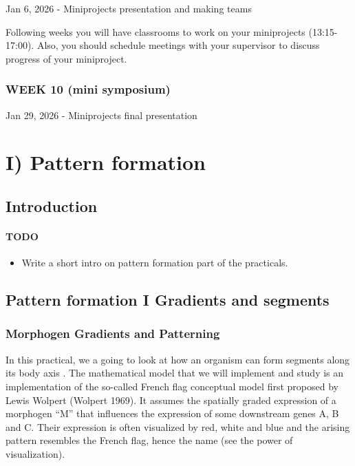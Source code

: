 \documentclass[
  letterpaper,
  DIV=11,
  numbers=noendperiod]{scrreprt}
\providecommand{\tightlist}{%
  \setlength{\itemsep}{0pt}\setlength{\parskip}{0pt}}\usepackage{longtable,booktabs,array}
\theoremstyle{definition}
\theoremstyle{remark}
\begin{document}
Jan 6, 2026 - Miniprojects presentation and making teams

Following weeks you will have classrooms to work on your miniprojects
(13:15-17:00). Also, you should schedule meetings with your supervisor
to discuss progress of your miniproject.

\section*{WEEK 10 (mini symposium)}\label{week-10-mini-symposium}


Jan 29, 2026 - Miniprojects final presentation

\part{I) Pattern formation}

\chapter{Introduction}\label{introduction}

\subsection{TODO}\label{todo}

\begin{itemize}
\tightlist
\item
  Write a short intro on pattern formation part of the practicals.
\end{itemize}

\chapter{\texorpdfstring{Pattern formation I Gradients and
segments}{Pattern formation I   Gradients and segments}}\label{pattern-formation-i-gradients-and-segments}

\section{Morphogen Gradients and
Patterning}\label{morphogen-gradients-and-patterning}

In this practical, we a going to look at how an organism can form
segments along its body axis . The mathematical model that we will
implement and study is an implementation of the so-called French flag
conceptual model first proposed by Lewis Wolpert (Wolpert 1969). It
assumes the spatially graded expression of a morphogen ``M'' that
influences the expression of some downstream genes A, B and C. Their
expression is often visualized by red, white and blue and the arising
pattern resembles the French flag, hence the name (see the power of
visualization).
\end{document}
